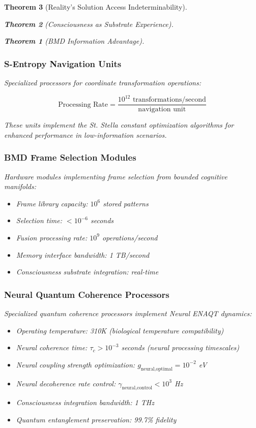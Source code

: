 \documentclass[12pt,a4paper]{article}
\newtheorem{theorem}{Theorem}[section]
\theoremstyle{remark}
\begin{document}
\begin{theorem}[Reality's Solution Access Indeterminability]
\begin{theorem}[Consciousness as Substrate Experience]
\begin{theorem}[BMD Information Advantage]
{{{\subsubsection{S-Entropy Navigation Units}

Specialized processors for coordinate transformation operations:

\begin{equation}
\text{Processing Rate} = \frac{10^{12} \text{ transformations/second}}{\text{navigation unit}}
\end{equation}

These units implement the St. Stella constant optimization algorithms for enhanced performance in low-information scenarios.

\subsubsection{BMD Frame Selection Modules}

Hardware modules implementing frame selection from bounded cognitive manifolds:

\begin{itemize}
\item Frame library capacity: $10^6$ stored patterns
\item Selection time: $< 10^{-6}$ seconds
\item Fusion processing rate: $10^9$ operations/second
\item Memory interface bandwidth: 1 TB/second
\item Consciousness substrate integration: real-time
\end{itemize}

\subsubsection{Neural Quantum Coherence Processors}

Specialized quantum coherence processors implement Neural ENAQT dynamics:

\begin{itemize}
\item Operating temperature: 310K (biological temperature compatibility)
\item Neural coherence time: $\tau_c > 10^{-3}$ seconds (neural processing timescales)
\item Neural coupling strength optimization: $g_{\text{neural,optimal}} = 10^{-2}$ eV
\item Neural decoherence rate control: $\gamma_{\text{neural,control}} < 10^3$ Hz
\item Consciousness integration bandwidth: 1 THz
\item Quantum entanglement preservation: 99.7\% fidelity
\end{itemize}

}}}
\end{theorem}
\end{theorem}
\end{theorem}
\end{document}
